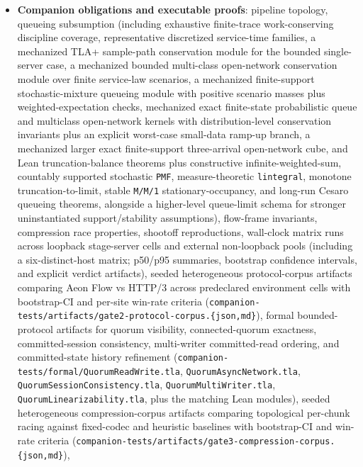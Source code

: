 \documentclass[
  11pt,
]{article}
\begin{document}
\begin{itemize}
\item
  \textbf{Companion obligations and executable proofs}: pipeline
  topology, queueing subsumption (including exhaustive finite-trace
  work-conserving discipline coverage, representative discretized
  service-time families, a mechanized TLA+ sample-path conservation
  module for the bounded single-server case, a mechanized bounded
  multi-class open-network conservation module over finite service-law
  scenarios, a mechanized finite-support stochastic-mixture queueing
  module with positive scenario masses plus weighted-expectation checks,
  mechanized exact finite-state probabilistic queue and multiclass
  open-network kernels with distribution-level conservation invariants
  plus an explicit worst-case small-data ramp-up branch, a mechanized
  larger exact finite-support three-arrival open-network cube, and Lean
  truncation-balance theorems plus constructive infinite-weighted-sum,
  countably supported stochastic \texttt{PMF}, measure-theoretic
  \texttt{lintegral}, monotone truncation-to-limit, stable
  \texttt{M/M/1} stationary-occupancy, and long-run Cesaro queueing
  theorems, alongside a higher-level queue-limit schema for stronger
  uninstantiated support/stability assumptions), flow-frame invariants,
  compression race properties, shootoff reproductions, wall-clock matrix
  runs across loopback stage-server cells and external non-loopback
  pools (including a six-distinct-host matrix; p50/p95 summaries,
  bootstrap confidence intervals, and explicit verdict artifacts),
  seeded heterogeneous protocol-corpus artifacts comparing Aeon Flow vs
  HTTP/3 across predeclared environment cells with bootstrap-CI and
  per-site win-rate criteria
  (\texttt{companion-\allowbreak{}tests/\allowbreak{}artifacts/\allowbreak{}gate2-\allowbreak{}protocol-\allowbreak{}corpus.\allowbreak{}\{json,md\}}),
  formal bounded-protocol artifacts for quorum visibility,
  connected-quorum exactness, committed-session consistency,
  multi-writer committed-read ordering, and committed-state history
  refinement (\texttt{companion-\allowbreak{}tests/\allowbreak{}formal/\allowbreak{}QuorumReadWrite.\allowbreak{}tla},
  \texttt{QuorumAsyncNetwork.tla},
  \texttt{QuorumSessionConsistency.tla}, \texttt{QuorumMultiWriter.tla},
  \texttt{QuorumLinearizability.tla}, plus the matching Lean modules),
  seeded heterogeneous compression-corpus artifacts comparing
  topological per-chunk racing against fixed-codec and heuristic
  baselines with bootstrap-CI and win-rate criteria
  (\texttt{companion-\allowbreak{}tests/\allowbreak{}artifacts/\allowbreak{}gate3-\allowbreak{}compression-\allowbreak{}corpus.\allowbreak{}\{json,md\}}),

\end{itemize}
\end{document}
